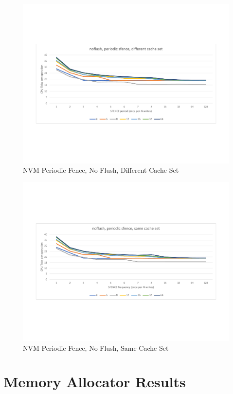 \begin{figure}
    \centering
    \caption{NVM Periodic Fence, No Flush, Different Cache Set}\label{micro:sfence:noflush:different}
    \includegraphics[scale=0.35]{micro/nvm-noflush-periodic-different.pdf}
\end{figure}

\begin{figure}
    \centering
    \caption{NVM Periodic Fence, No Flush, Same Cache Set}\label{micro:sfence:noflush:same}
    \includegraphics[scale=0.35]{micro/nvm-noflush-periodic-same.pdf}
\end{figure}

\section{Memory Allocator Results}\label{section:results:malloc}

